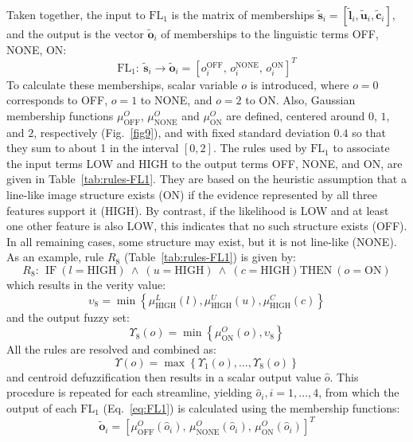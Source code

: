 \begin{figure}[!t]
	\label{fig7}
\end{figure}

Taken together, the input to $\textrm{FL}_{1}$ is the matrix of memberships $\tilde{\mathbf{s}}_{i}=[\tilde{\mathbf{l}}_{i},\tilde{\mathbf{u}}_{i},\tilde{\mathbf{c}}_{i}]$, and the output is the vector $\tilde{\mathbf{o}}_{i}$ of memberships to the linguistic terms OFF, NONE, ON:
\begin{equation}
\mathrm{FL}_{1}\!:\ \tilde{\mathbf{s}}_{i} \rightarrow \tilde{\mathbf{o}}_{i} = \left[o_{i}^{\textrm{OFF}}\!,\, o_{i}^{\textrm{NONE}}\!,\, o_{i}^{\textrm{ON}}\right]^T
\label{eq:FL1}
\end{equation}
To calculate these memberships, scalar variable $o$ is introduced, where $o=0$ corresponds to OFF, $o=1$ to NONE, and $o=2$ to ON. Also, Gaussian membership functions $\mu_{\textrm{OFF}}^{O}$, $\mu_{\textrm{NONE}}^{O}$ and $\mu_{\textrm{ON}}^{O}$  are defined, centered around $0$, $1$, and $2$, respectively (Fig.~\ref{fig9}), and with fixed standard deviation $0.4$ so that they sum to about 1 in the interval $[0,2]$. The rules used by $\textrm{FL}_{1}$ to associate the input terms LOW and HIGH to the output terms OFF, NONE, and ON, are given in Table~\ref{tab:rules-FL1}. They are based on the heuristic assumption that a line-like image structure exists (ON) if the evidence represented by all three features support it (HIGH). By contrast, if the likelihood is LOW and at least one other feature is also LOW, this indicates that no such structure exists (OFF). In all remaining cases, some structure may exist, but it is not line-like (NONE). As an example, rule $R_8$ (Table~\ref{tab:rules-FL1}) is given by:
\begin{equation}
R_8\!:\ \ \textrm{IF}\ (l=\textrm{HIGH})\ \wedge\ (u=\textrm{HIGH})\ \wedge\ (c=\textrm{HIGH}) \textrm{THEN}\ (o = \textrm{ON})
\end{equation}
which results in the verity value:
\begin{equation}
\upsilon_{8} = \min\left\{\mu_{\textrm{HIGH}}^{L}(l), \mu_{\textrm{HIGH}}^{U}(u), \mu_{\textrm{HIGH}}^{C}(c)\right\}
\end{equation}
and the output fuzzy set: 
\begin{equation}
\Upsilon_{8}(o) = \min\left\{\mu_{\textrm{ON}}^{O}(o),\upsilon_{8}\right\}
\end{equation}
All the rules are resolved and combined as:
\begin{equation}
\Upsilon(o) = \max\left\{\Upsilon_{1}(o),\dots,\Upsilon_{8}(o)\right\}
\end{equation}
and centroid defuzzification then results in a scalar output value $\hat{o}$. This procedure is repeated for each streamline, yielding $\hat{o}_{i}, i=1,\dots,4$, from which the output of each $\mathrm{FL}_{1}$ (Eq.~\ref{eq:FL1}) is calculated using the membership functions:
\begin{equation}
\tilde{\mathbf{o}}_{i} = \left[\mu_{\textrm{OFF}}^{O}(\hat{o}_{i}),\, \mu_{\textrm{NONE}}^{O}(\hat{o}_{i}),\, \mu_{\textrm{ON}}^{O}(\hat{o}_{i})\right]^{T}
\end{equation}

